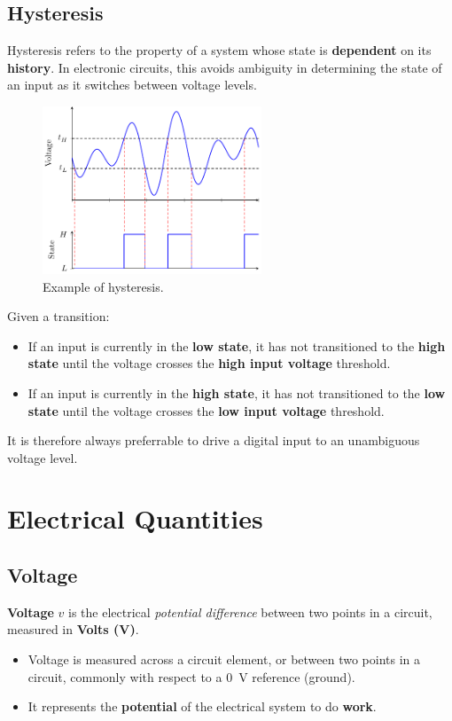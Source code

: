 \documentclass{report}
\begin{document}
\subsection{Hysteresis}
Hysteresis refers to the property of a system whose state is \textbf{dependent} on
its \textbf{history}. In electronic circuits, this avoids ambiguity in determining
the state of an input as it switches between voltage levels.
\begin{figure}[H]
    \centering
    \includegraphics[height = 5cm, keepaspectratio = true]{figures/hysteresis.pdf}
    \caption{Example of hysteresis.} %
\end{figure}
Given a transition:
\begin{itemize}
    \item If an input is currently in the \textbf{low state}, it has not transitioned to the \textbf{high state} until the voltage crosses the \textbf{high input voltage} threshold.
    \item If an input is currently in the \textbf{high state}, it has not transitioned to the \textbf{low state} until the voltage crosses the \textbf{low input voltage} threshold.
\end{itemize}
It is therefore always preferrable to drive a digital input to an unambiguous voltage level.
\section{Electrical Quantities}
\subsection{Voltage}
\textbf{Voltage} \(v\) is the electrical \textit{potential difference} between two points in a circuit, measured in \textbf{Volts (\unit{V})}.
\begin{itemize}
    \item Voltage is measured across a circuit element, or between two points in a circuit, commonly with respect to a \qty{0}{V} reference (ground).
    \item It represents the \textbf{potential} of the electrical system to do \textbf{work}.
\end{itemize}
\end{document}
